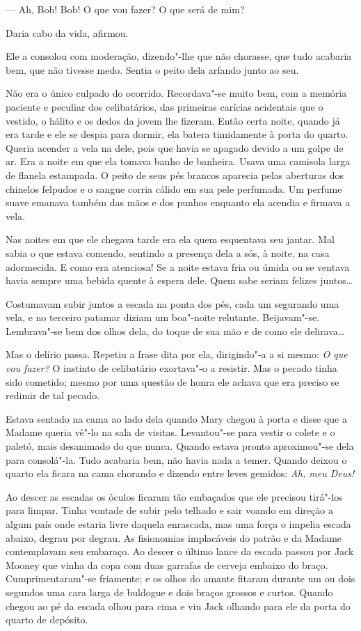 --- Ah, Bob! Bob!  O que vou fazer?  O que será de mim?

Daria cabo da vida, afirmou.

Ele a consolou com moderação, dizendo"-lhe que não chorasse, que tudo acabaria
bem, que não tivesse medo.  Sentia o peito dela arfando junto ao seu.

Não era o único culpado do ocorrido.  Recordava"-se muito bem, com a memória
paciente e peculiar dos celibatários, das primeiras carícias acidentais que o
vestido, o hálito e os dedos da jovem lhe fizeram.  Então certa noite, quando
já era tarde e ele se despia para dormir, ela batera timidamente à porta do
quarto.  Queria acender a vela na dele, pois que havia se apagado devido a um
golpe de ar.  Era a noite em que ela tomava banho de banheira.  Usava uma
camisola larga de flanela estampada.  O peito de seus pés brancos aparecia
pelas aberturas dos chinelos felpudos e o sangue corria cálido em sua pele
perfumada.  Um perfume suave emanava também das mãos e dos punhos enquanto ela
acendia e firmava a vela.

Nas noites em que ele chegava tarde era ela quem esquentava seu jantar.  Mal
sabia o que estava comendo, sentindo a presença dela a sós, à noite, na casa
adormecida.  E como era atenciosa!  Se a noite estava fria ou úmida ou se
ventava havia sempre uma bebida quente à espera dele.  Quem sabe seriam felizes
juntos\ldots{}

Costumavam subir juntos a escada na ponta dos pés, cada um segurando uma vela,
e no terceiro patamar diziam um boa"-noite relutante.  Beijavam"-se.  Lembrava"-se
bem dos olhos dela, do toque de sua mão e de como ele delirava\ldots{}

Mas o delírio passa.  Repetiu a frase dita por ela, dirigindo"-a a si mesmo:
\textit{O que vou fazer?}  O instinto de celibatário exortava"-o a resistir.
Mas o pecado tinha sido cometido; mesmo por uma questão de honra ele achava que
era preciso se redimir de tal pecado.

Estava sentado na cama ao lado dela quando Mary chegou à porta e disse que a
Madame queria vê"-lo na sala de visitas.  Levantou"-se para vestir o colete e o
paletó, mais desanimado do que nunca.  Quando estava pronto aproximou"-se dela
para consolá"-la.  Tudo acabaria bem, não havia nada a temer.  Quando deixou o
quarto ela ficara na cama chorando e dizendo entre leves gemidos: \textit{Ah,
meu Deus!}

Ao descer as escadas os óculos ficaram tão embaçados que ele precisou tirá"-los
para limpar.  Tinha vontade de subir pelo telhado e sair voando em direção a
algum país onde estaria livre daquela enrascada, mas uma força o impelia escada
abaixo, degrau por degrau.  As fisionomias implacáveis do patrão e da Madame
contemplavam seu embaraço.  Ao descer o último lance da escada passou por Jack
Mooney que vinha da copa com duas garrafas de cerveja embaixo do braço.
Cumprimentaram"-se friamente; e os olhos do amante fitaram durante um ou dois
segundos uma cara larga de buldogue e dois braços grossos e curtos.  Quando
chegou ao pé da escada olhou para cima e viu Jack olhando para ele da porta do
quarto de depósito.

